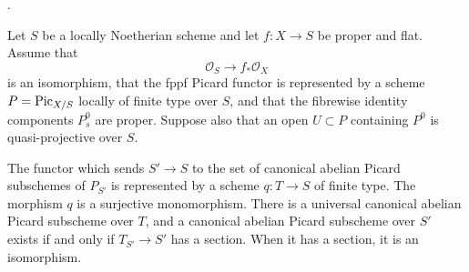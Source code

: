 \begin{proposition}
\label{proposition-canonical-abelian-picard-parameter}
\begin{reference}
\cite[Expos\'e 236, Theorem 3.3(ii), pp. 237--238]{FGA}.
\end{reference}
Let $S$ be a locally Noetherian scheme and let $f : X \to S$ be proper and
flat. Assume that
$$
\mathcal{O}_S \longrightarrow f_*\mathcal{O}_X
$$
is an isomorphism, that the fppf Picard functor is represented by a scheme
$P = \mathrm{Pic}_{X/S}$ locally of finite type over $S$, and that the
fibrewise identity components $P_s^0$ are proper. Suppose also that an open
$U \subset P$ containing $P^0$ is quasi-projective over $S$.

The functor which sends $S' \to S$ to the set of canonical abelian Picard
subschemes of $P_{S'}$ is represented by a scheme $q : T \to S$ of finite
type. The morphism $q$ is a surjective monomorphism. There is a universal
canonical abelian Picard subscheme over $T$, and a canonical abelian Picard
subscheme over $S'$ exists if and only if $T_{S'} \to S'$ has a section.
When it has a section, it is an isomorphism.
\end{proposition}

